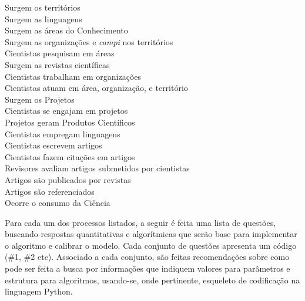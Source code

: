 \begin{description}

\item [Surgem os territórios] 

\item [Surgem as linguagens] 

\item [Surgem as áreas do Conhecimento] 

\item [Surgem as organizações e \textit{campi} nos territórios] 

\item [Cientistas pesquisam em áreas] 

\item [Surgem as revistas científicas]

\item [Cientistas trabalham em organizações] 

\item [Cientistas atuam em área, organização, e  território] 

\item [Surgem os Projetos] 
\item [Cientistas se engajam em projetos] 
\item [Projetos geram Produtos Científicos] 
\item[Cientistas empregam linguagens] 

\item [Cientistas escrevem artigos] 

\item [Cientistas fazem citações em artigos] 

\item [Revisores avaliam artigos submetidos por cientistas]  

\item [Artigos são publicados por revistas] 
\item [Artigos são referenciados] 
\item [Ocorre o consumo da Ciência] 
\end{description}

Para cada um dos processos listados, a seguir é feita uma lista de questões, buscando respostas quantitativas e algorítmicas que serão base para implementar o algoritmo e calibrar o modelo. Cada conjunto de questões apresenta um código (\#1, \#2 etc). Associado a cada conjunto, são feitas recomendações sobre como pode ser feita a busca por informações que indiquem valores para parâmetros e estrutura para algoritmos, usando-se, onde pertinente, esqueleto de codificação na linguagem Python.   


